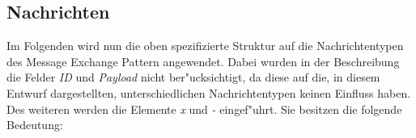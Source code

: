 




\subsection{Nachrichten}
Im Folgenden wird nun die oben spezifizierte Struktur auf die Nachrichtentypen des Message Exchange Pattern angewendet. Dabei wurden in der Beschreibung die Felder \emph{ID} und \emph{Payload} nicht ber"ucksichtigt, da diese auf die, in diesem Entwurf dargestellten, unterschiedlichen Nachrichtentypen keinen Einfluss haben. Des weiteren werden die Elemente \emph{x} und \emph{-} eingef"uhrt. Sie besitzen die folgende Bedeutung:

